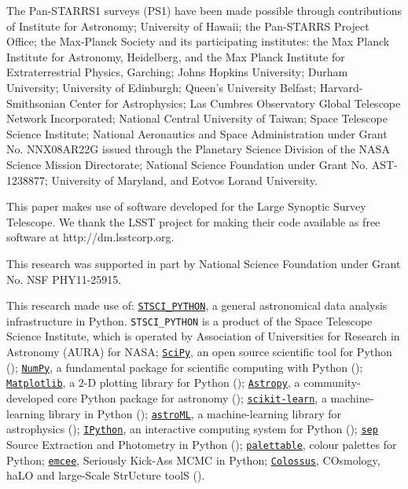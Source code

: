 \documentclass[a4paper,fleqn,usenatbib]{mnras}
\begin{document}
  The Pan-STARRS1 surveys (PS1) have been made possible through contributions of  
  Institute for Astronomy; University of Hawaii; the Pan-STARRS Project Office; 
  the Max-Planck Society and its participating institutes: the Max Planck Institute 
  for Astronomy, Heidelberg, and the Max Planck Institute for Extraterrestrial Physics, 
  Garching; Johns Hopkins University; Durham University; University of Edinburgh; 
  Queen's University Belfast; Harvard-Smithsonian Center for Astrophysics; Las 
  Cumbres Observatory Global Telescope Network Incorporated; National Central 
  University of Taiwan; Space Telescope Science Institute; National Aeronautics 
  and Space Administration under Grant No. NNX08AR22G issued through the Planetary 
  Science Division of the NASA Science Mission Directorate; National Science 
  Foundation under Grant No. AST-1238877; University of Maryland, and Eotvos 
  Lorand University. 
  
  This paper makes use of software developed for the Large Synoptic Survey 
  Telescope. We thank the LSST project for making their code available as free 
  software at http://dm.lsstcorp.org.
 
  This research was supported in part by National Science Foundation under Grant 
  No. NSF PHY11-25915. 
  
  This research made use of:
  \href{http://www.stsci.edu/institute/software_hardware/pyraf/stsci\_python}{\texttt{STSCI\_PYTHON}},
      a general astronomical data analysis infrastructure in Python. 
      \texttt{STSCI\_PYTHON} is a product of the Space Telescope Science Institute, 
      which is operated by Association of Universities for Research 
      in Astronomy (AURA) for NASA;
  \href{http://www.scipy.org/}{\texttt{SciPy}},
      an open source scientific tool for Python (\citealt{SciPy});
  \href{http://www.numpy.org/}{\texttt{NumPy}}, 
      a fundamental package for scientific computing with Python (\citealt{NumPy});
  \href{http://matplotlib.org/}{\texttt{Matplotlib}}, 
      a 2-D plotting library for Python (\citealt{Matplotlib});
  \href{http://www.astropy.org/}{\texttt{Astropy}}, a community-developed 
      core Python package for astronomy (\citealt{AstroPy}); 
  \href{http://scikit-learn.org/stable/index.html}{\texttt{scikit-learn}},
      a machine-learning library in Python (\citealt{scikit-learn}); 
  \href{http://www.astroml.org/}{\texttt{astroML}}, 
      a machine-learning library for astrophysics (\citealt{astroML});
  \href{https://ipython.org}{\texttt{IPython}}, 
      an interactive computing system for Python (\citealt{IPython});
  \href{https://github.com/kbarbary/sep}{\texttt{sep}} 
      Source Extraction and Photometry in Python (\citealt{PythonSEP});
  \href{https://jiffyclub.github.io/palettable/}{\texttt{palettable}},
      colour palettes for Python;
  \href{http://dan.iel.fm/emcee/current/}{\texttt{emcee}}, 
      Seriously Kick-Ass MCMC in Python;
  \href{http://bdiemer.bitbucket.org/}{\texttt{Colossus}}, 
      COsmology, haLO and large-Scale StrUcture toolS (\citealt{Colossus}).
\end{document}
